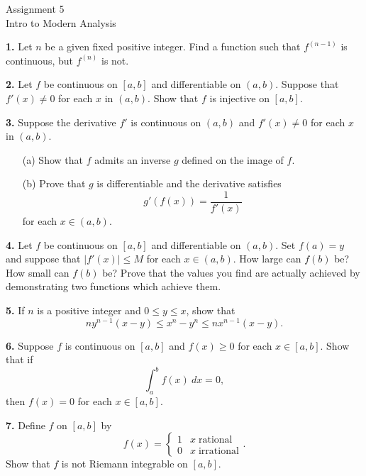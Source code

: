 \documentclass[12pt]{article}
\begin{document}
\begin{center}
Assignment 5\\
Intro to Modern Analysis
\end{center}



\noindent \textbf{1.} Let $n$ be a given fixed positive integer. Find a function such that $f^{(n-1)}$ is continuous, but $f^{(n)}$ is not. 

\medskip

\noindent \textbf{2.} Let $f$ be continuous on $[a,b]$ and differentiable on $(a,b)$. Suppose that $f'(x) \ne 0$ for each $x$ in $(a,b)$. Show that $f$ is injective on $[a,b]$. 

\medskip



\noindent \textbf{3.} Suppose the derivative $f'$ is continuous on $(a,b)$ and $f'(x) \ne 0$ for each $x$ in $(a,b)$.  
\begin{enumerate}
\item[(a)] Show that $f$ admits an inverse $g$ defined on the image of $f$. 
\item[(b)] Prove that $g$ is differentiable and the derivative satisfies 
\[
g'(f(x)) = \frac{1}{f'(x)}
\]
for each $x \in (a,b)$. 
\end{enumerate}

\medskip

\noindent \textbf{4.} Let $f$ be continuous on $[a,b]$ and differentiable on $(a,b)$. Set $f(a) = y$ and suppose that $|f'(x)| \leqslant M$ for each $x \in (a,b)$. How large can $f(b)$ be? How small can $f(b)$ be? Prove that the values you find are actually achieved by demonstrating two functions which achieve them. 

\medskip

\noindent \textbf{5.} If $n$ is a positive integer and $0 \leqslant y \leqslant x$, show that 
\[
ny^{n-1}(x - y) \leqslant x^n - y^n \leqslant nx^{n-1}(x -y). 
\]

\medskip

\noindent \textbf{6.} Suppose $f$ is continuous on $[a,b]$ and $f(x) \geqslant 0$ for each $x \in [a,b]$. Show that if  
\[
\int_a^b f(x)\:dx = 0,
\]
then $f(x) = 0$ for each $x \in [a,b]$. 

\medskip

\noindent \textbf{7.} Define $f$ on $[a,b]$ by 
\[
f(x) = \begin{cases}
1 & x \; \text{rational} \\
0 & x \; \text{irrational}
\end{cases}.
\]
Show that $f$ is not Riemann integrable on $[a,b]$.
\end{document}
